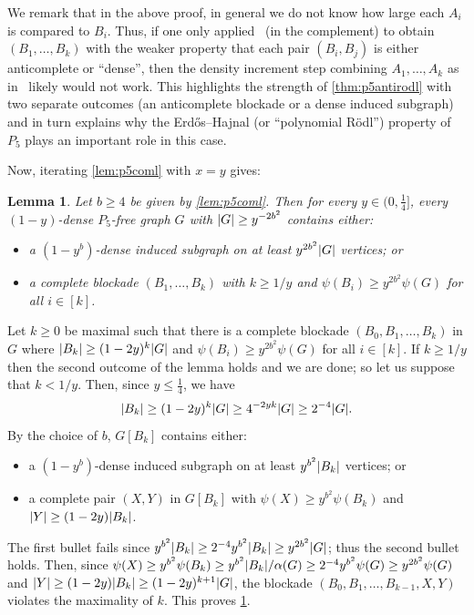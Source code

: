 \documentclass[11pt,reqno]{amsart}
\newtheorem{lemma}[theorem]{Lemma}
\let\oldendproof\endproof
\renewenvironment{proof}[1][\proofname]{%
	\oldproof[\normalfont\bfseries #1]%
}{\oldendproof}
\newcommand{\dd}{\textquotedblleft}
\newcommand{\ee}{\textquotedblright}
\newcommand{\erh}{Erd\H{o}s--Hajnal}
\DeclarePairedDelimiter\abs{\lvert}{\rvert}%
\begin{document}
	We remark that in the above proof, in general we do not know how large each $A_i$ is compared to $B_i$. Thus, if one only applied~\cite[Theorem 5.1]{density7} (in the complement) to obtain $(B_1,\ldots,B_k)$ with the weaker property that each pair $(B_i,B_j)$ is either anticomplete or \dd dense\ee{}, then the density increment step combining $A_1,\ldots,A_k$ as in~\cite[Section 7]{density7} likely would not work.
	This highlights the strength of \cref{thm:p5antirodl} with two separate outcomes (an anticomplete blockade or a dense induced subgraph) and in turn explains why the \erh{} (or \dd polynomial R\"odl\ee) property of $P_5$ plays an important role in this case.
	
	
	Now, iterating \cref{lem:p5coml} with $x=y$ gives:
	\begin{lemma}
		\label{lem:p5compl}
		Let $b\ge4$ be given by \cref{lem:p5coml}. Then for every $y\in(0,\frac14]$, every $(1-y)$-dense $P_5$-free graph $G$ with $\abs G\ge y^{-2b^2}$ contains either:
		\begin{itemize}
			\item a $(1-y^b)$-dense induced subgraph on at least $y^{2b^2}\abs G$ vertices; or
			
			\item a complete blockade $(B_1,\ldots,B_k)$ with $k\ge1/y$ and $\psi(B_i)\ge y^{2b^2}\psi(G)$ for all $i\in[k]$.
		\end{itemize}
	\end{lemma}
	\begin{proof}
		Let $k\ge0$ be maximal such that there is a complete blockade $(B_0,B_1,\ldots,B_k)$ in $G$ where $\abs{B_k}\ge(1-2y)^k\abs G$ and $\psi(B_i)\ge y^{2b^2}\psi(G)$ for all $i\in[k]$.
		If $k\ge1/y$ then the second outcome of the lemma holds and we are done; so let us suppose that $k<1/y$.
		Then, since $y\le\frac14$, we have
		\[\abs{B_k}\ge(1-2y)^{k}\abs G
		\ge 4^{-2yk}\abs G\ge 2^{-4}\abs G.\]
		By the choice of $b$, $G[B_k]$ contains either:
		\begin{itemize}
			\item a $(1-y^b)$-dense induced subgraph on at least $y^{b^2}\abs{B_k}$ vertices; or
			
			\item a complete pair $(X,Y)$ in $G[B_k]$ with $\psi(X)\ge y^{b^2}\psi(B_k)$ and $\abs Y\ge(1-2y)\abs{B_k}$.
		\end{itemize}
		
		The first bullet fails since $y^{b^2}\abs{B_k}\ge2^{-4}y^{b^2}\abs{B_k}\ge y^{2b^2}\abs G$;
		thus the second bullet holds.
		Then, since $\psi(X)\ge y^{b^2}\psi(B_k)\ge y^{b^2}\abs{B_k}/\alpha(G)\ge 2^{-4}y^{b^2}\psi(G)\ge y^{2b^2}\psi(G)$
		and $\abs Y\ge(1-2y)\abs{B_k}\ge(1-2y)^{k+1}\abs G$,
		the blockade $(B_0,B_1,\ldots,B_{k-1},X,Y)$ violates the maximality of $k$.
		This proves \cref{lem:p5compl}.
	\end{proof}
\end{document}

